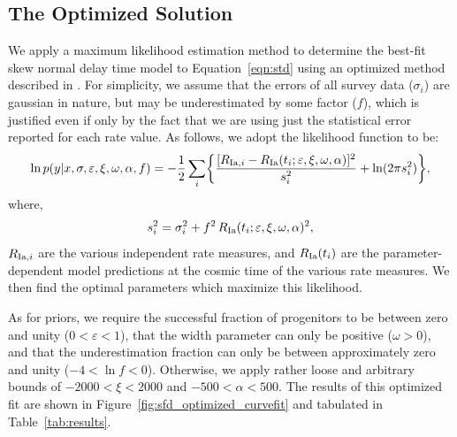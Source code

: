 \documentclass[apj]{aastex62}
\begin{document}
\subsection{The Optimized Solution\label{sec:optimized_soln}}
We apply a maximum likelihood estimation method to determine the best-fit skew normal delay time model to Equation~\ref{eqn:std} using an optimized method described in \cite{Hogg:2010fj}. For simplicity, we assume that the errors of all survey data ($\sigma_i$) are gaussian in nature, but may be underestimated by some factor ($f$), which is justified even if only by the fact that we are using just the statistical error reported for each rate value.  As follows, we adopt the likelihood function to be:
\begin{equation}
\ln p(y|x, \sigma, \varepsilon, \xi, \omega, \alpha, f) = -\frac{1}{2} \sum_i \biggl\{ \frac{[R_{{\rm Ia},i} - R_{\rm Ia}(t_i; \varepsilon, \xi, \omega, \alpha)]^2}{s_i^2}+\ln (2\pi s_i^2)\biggr\},
	\label{eqn:lf}
\end{equation}
where,
\begin{equation}
s_i^2 = \sigma_i^2+f^2\, R_{\rm Ia}(t_i; \varepsilon, \xi, \omega, \alpha)^2,
\end{equation}
\noindent $R_{{\rm Ia},i}$ are the various independent rate measures, and $R_{\rm Ia}(t_i)$ are the parameter-dependent model predictions at the cosmic time of the various rate measures. We then find the optimal parameters which maximize this likelihood. 

As for priors, we require the successful fraction of progenitors to be between zero and unity ($0<\varepsilon<1$), that the width parameter can only be positive ($\omega>0$), and that the underestimation fraction can only be between approximately zero and unity ($-4<\ln f<0$). Otherwise, we apply rather loose and arbitrary bounds of $-2000<\xi<2000$ and  $-500 < \alpha < 500$. The results of this optimized fit are shown in Figure~\ref{fig:sfd_optimized_curvefit} and tabulated in Table~\ref{tab:results}.
\end{document}
